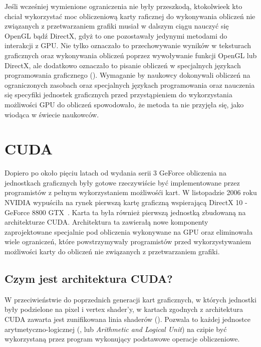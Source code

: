 Jeśli wcześniej wymienione ograniczenia nie były przeszkodą, ktokolwieek kto chciał wykorzystać moc obliczeniową karty raficznej do wykonywania obliczeń nie związanych z przetwarzaniem grafiki musiał w dalszym ciągu nauczyć się OpenGL bądź DirectX, gdyż to one pozostawały jedynymi metodami do interakcji z GPU. Nie tylko oznaczało to przechowywanie wyników w teksturach graficznych oraz wykonywania obliczeń poprzez wywoływanie funkcji OpenGL lub DirectX, ale dodatkowo oznaczało to pisanie obliczeń w specjalnych językach programowania graficznego (). Wymaganie by naukowcy dokonywali obliczeń na ograniczonych zasobach oraz specjalnych językach programowania oraz nauczenia się specyfiki jednostek graficznych przed przystąpieniem do wykorzystania możliwości GPU do obliczeń spowodowało, że metoda ta nie przyjęła się, jako wiodąca w świecie naukowców.

\section{CUDA}

Dopiero po około pięciu latach od wydania serii 3 GeForce obliczenia na jednostkach graficznych były gotowe rzeczywiście być implementowane przez programistów z pełnym wykorzystaniem możliwośći kart. W listopadzie 2006 roku NVIDIA wypuściła na rynek pierwszą kartę graficzną wspierającą DirectX 10 - GeForce 8800 GTX~\cite{nvidia:geforce8800}. Karta ta była również pierwszą jednostką zbudowaną na architekturze CUDA. Architektura ta zawierałą nowe komponenty zaprojektowane specjalnie pod obliczenia wykonywane na GPU oraz eliminowała wiele ograniczeń, które powstrzymywały programistów przed wykorzystywaniem możliwości karty do obliczeń nie związanych z przetwarzaniem grafiki.

\subsection{Czym jest architektura CUDA?}

W przeciwieństwie do poprzednich generacji kart graficznych, w których jednostki były podzielone na pixel i vertex shader'y, w kartach zgodnych z architektura CUDA zawarta jest zunifikowana linia shaderów (). Pozwala to każdej jednostce arytmetyczno-logicznej (,  lub \emph{Arithmetic and Logical Unit}) na czipie być wykorzystaną przez program wykonujący podstawowe operacje obliczeniowe.

